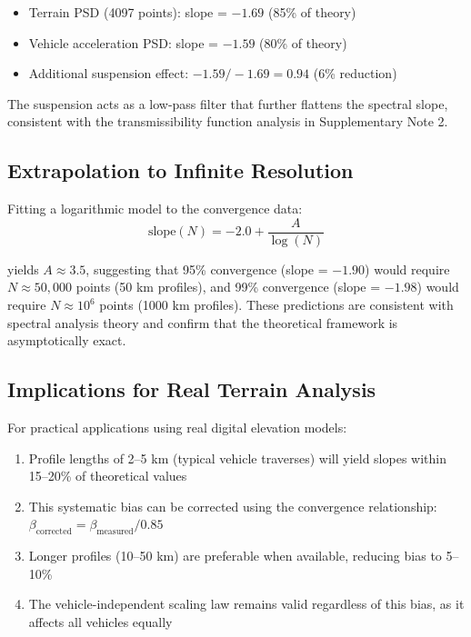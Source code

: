 \documentclass[11pt]{article}
\begin{document}
\begin{itemize}
\item Terrain PSD (4097 points): slope = $-1.69$ (85\% of theory)
\item Vehicle acceleration PSD: slope = $-1.59$ (80\% of theory)
\item Additional suspension effect: $-1.59 / -1.69 = 0.94$ (6\% reduction)
\end{itemize}

The suspension acts as a low-pass filter that further flattens the spectral slope, consistent with the transmissibility function analysis in Supplementary Note 2.

\subsection{Extrapolation to Infinite Resolution}

Fitting a logarithmic model to the convergence data:
\begin{equation}
\text{slope}(N) = -2.0 + \frac{A}{\log(N)}
\end{equation}

yields $A \approx 3.5$, suggesting that 95\% convergence (slope = $-1.90$) would require $N \approx 50{,}000$ points (50 km profiles), and 99\% convergence (slope = $-1.98$) would require $N \approx 10^6$ points (1000 km profiles). These predictions are consistent with spectral analysis theory and confirm that the theoretical framework is asymptotically exact.

\subsection{Implications for Real Terrain Analysis}

For practical applications using real digital elevation models:
\begin{enumerate}
\item Profile lengths of 2--5 km (typical vehicle traverses) will yield slopes within 15--20\% of theoretical values

\item This systematic bias can be corrected using the convergence relationship: $\beta_{\text{corrected}} = \beta_{\text{measured}} / 0.85$

\item Longer profiles (10--50 km) are preferable when available, reducing bias to 5--10\%

\item The vehicle-independent scaling law remains valid regardless of this bias, as it affects all vehicles equally
\end{enumerate}
\end{document}
